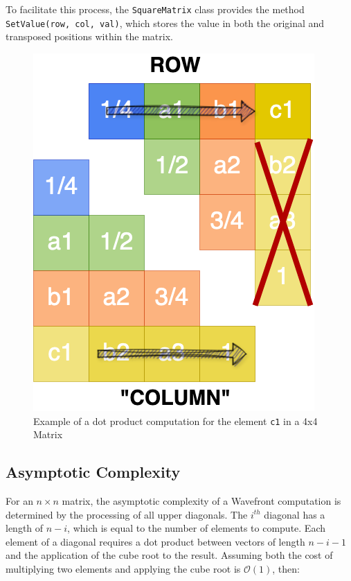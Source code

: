\par To facilitate this process, the \texttt{SquareMatrix} class provides the method \texttt{SetValue(row, col, val)}, which stores the value in both the original and transposed positions within the matrix.

\begin{figure}[h]
    \centering\includegraphics[scale=0.35]{img/Sequential Implementation/Locality_of_reference.drawio.png}
    
    \caption{Example of a dot product computation for the element \texttt{c1} in a 4x4 Matrix}
\end{figure}

\subsection*{Asymptotic Complexity}
For an $n \times n$ matrix, the asymptotic complexity of a Wavefront computation is determined by the processing of all upper diagonals. The $i^{th}$ diagonal has a length of $n - i$, which is equal to the number of elements to compute. Each element of a diagonal requires a dot product between vectors of length $n - i - 1$ and the application of the cube root to the result. Assuming both the cost of multiplying two elements and applying the cube root is $\mathcal{O}(1)$, then:

